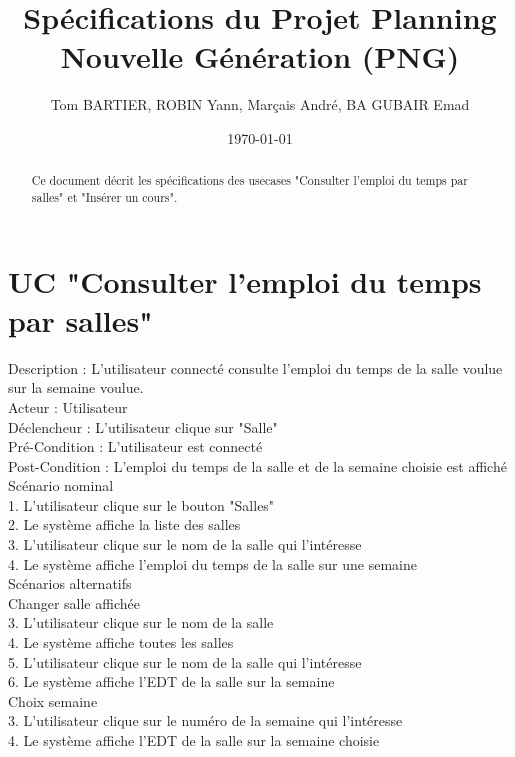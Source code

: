\documentclass[12pt,a4paper]{article}
\title{Spécifications du Projet Planning Nouvelle Génération (PNG)}
\author{Tom BARTIER, ROBIN Yann, Marçais André, BA GUBAIR Emad}
\date{\today}
\begin{document}
\maketitle

\begin{abstract}
    Ce document décrit les spécifications des usecases "Consulter l'emploi du temps par salles" et 
    "Insérer un cours".
\end{abstract}

\section{UC "Consulter l'emploi du temps par salles"}
Description : L'utilisateur connecté consulte l'emploi du temps de la salle voulue sur la semaine voulue.\\
Acteur : Utilisateur \\
Déclencheur : L'utilisateur clique sur "Salle"\\
Pré-Condition : L'utilisateur est connecté\\
Post-Condition : L'emploi du temps de la salle et de la semaine choisie est affiché
\\

Scénario nominal\\
1. L'utilisateur clique sur le bouton "Salles"\\
2. Le système affiche la liste des salles\\
3. L'utilisateur clique sur le nom de la salle qui l'intéresse\\
4. Le système affiche l'emploi du temps de la salle sur une semaine\\

Scénarios alternatifs\\
Changer salle affichée\\
3. L'utilisateur clique sur le nom de la salle\\
4. Le système affiche toutes les salles\\
5. L'utilisateur clique sur le nom de la salle qui l'intéresse\\
6. Le système affiche l'EDT de la salle sur la semaine\\

Choix semaine\\
3. L'utilisateur clique sur le numéro de la semaine qui l'intéresse\\
4. Le système affiche l'EDT de la salle sur la semaine choisie\\
\end{document}
